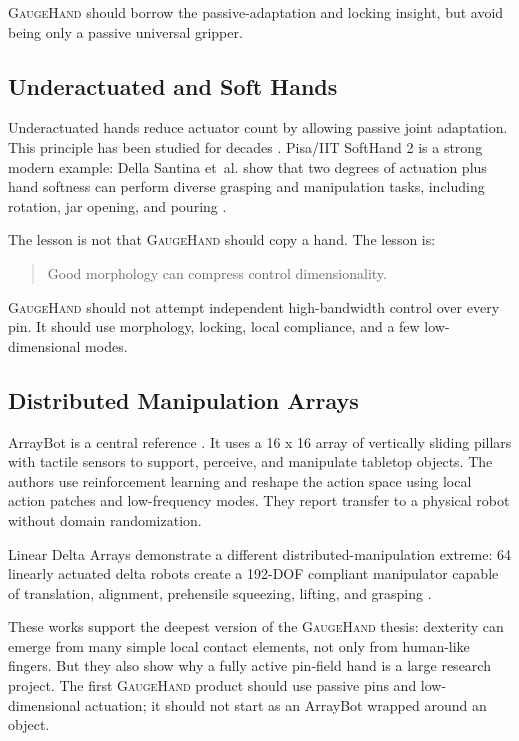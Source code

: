 \documentclass[11pt]{article}
\newcommand{\GaugeHand}{\textsc{GaugeHand}}
\newcommand{\etal}{et~al.}
\begin{document}
\GaugeHand{} should borrow the passive-adaptation and locking insight, but avoid being only a passive universal gripper.

\subsection{Underactuated and Soft Hands}

Underactuated hands reduce actuator count by allowing passive joint adaptation. This principle has been studied for decades \cite{laliberte2002underactuation,birglen2006force}. Pisa/IIT SoftHand 2 is a strong modern example: Della Santina \etal{} show that two degrees of actuation plus hand softness can perform diverse grasping and manipulation tasks, including rotation, jar opening, and pouring \cite{dellasantina2018softhand2}.

The lesson is not that \GaugeHand{} should copy a hand. The lesson is:

\begin{quote}
Good morphology can compress control dimensionality.
\end{quote}

\GaugeHand{} should not attempt independent high-bandwidth control over every pin. It should use morphology, locking, local compliance, and a few low-dimensional modes.

\subsection{Distributed Manipulation Arrays}

ArrayBot is a central reference \cite{xue2023arraybot}. It uses a 16 x 16 array of vertically sliding pillars with tactile sensors to support, perceive, and manipulate tabletop objects. The authors use reinforcement learning and reshape the action space using local action patches and low-frequency modes. They report transfer to a physical robot without domain randomization.

Linear Delta Arrays demonstrate a different distributed-manipulation extreme: 64 linearly actuated delta robots create a 192-DOF compliant manipulator capable of translation, alignment, prehensile squeezing, lifting, and grasping \cite{patil2022linear_delta_arrays}.

These works support the deepest version of the \GaugeHand{} thesis: dexterity can emerge from many simple local contact elements, not only from human-like fingers. But they also show why a fully active pin-field hand is a large research project. The first \GaugeHand{} product should use passive pins and low-dimensional actuation; it should not start as an ArrayBot wrapped around an object.
\end{document}

